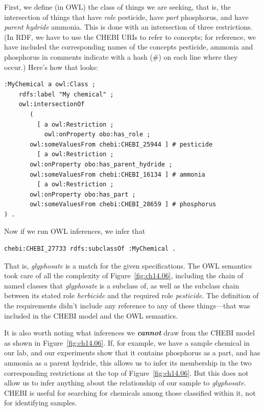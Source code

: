 First, we define (in OWL) the class of things we are seeking, that is,
the intersection of things that have \textit{role} pesticide, have \textit{part}
phosphorus, and have \textit{parent hydride} ammonia. This is done with an
intersection of three restrictions. (In RDF, we have to use the CHEBI
URIs to refer to concepts; for reference, we have included the
corresponding names of the concepts pesticide, ammonia and
phosphorus in comments indicate with a hash (\#) on each line where they
occur.) Here's how that looks:

\begin{lstlisting}
:MyChemical a owl:Class ;
    rdfs:label "My chemical" ;
    owl:intersectionOf
       (
         [ a owl:Restriction ;
           owl:onProperty obo:has_role ;
	   owl:someValuesFrom chebi:CHEBI_25944 ] # pesticide
         [ a owl:Restriction ;
	   owl:onProperty obo:has_parent_hydride ;
	   owl:someValuesFrom chebi:CHEBI_16134 ] # ammonia
         [ a owl:Restriction ;
	   owl:onProperty obo:has_part ;
	   owl:someValuesFrom chebi:CHEBI_28659 ] # phosphorus
) .
\end{lstlisting}

Now if we run OWL inferences, we infer that

\begin{lstlisting}
chebi:CHEBI_27733 rdfs:subclassOf :MyChemical .
\end{lstlisting}

That is, \textit{glyphosate} is a match for the given specifications. The OWL
semantics took care of all the complexity of Figure~\ref{fig:ch14.06}, including the
chain of named classes that \textit{glyphosate} is a subclass of, as well as the
subclass chain between its stated role \textit{herbicide} and the required role
\textit{pesticide}. The definition of the requirements didn't include any
reference to any of these things---that was included in the CHEBI model
and the OWL semantics.

It is also worth noting what inferences we \textbf{\textit{cannot}} draw from the CHEBI
model as shown in Figure~\ref{fig:ch14.06}. If, for example, we have a sample
chemical in our lab, and our experiments show that it contains
phosphorus as a part, and has ammonia as a parent hydride, this allows
us to infer its membership in the two corresponding restrictions at the
top of Figure~\ref{fig:ch14.06}. But this does not allow us to infer anything about
the relationship of our sample to \textit{glyphosate}. CHEBI is useful for
searching for chemicals among those classified within it, not for
identifying samples.

